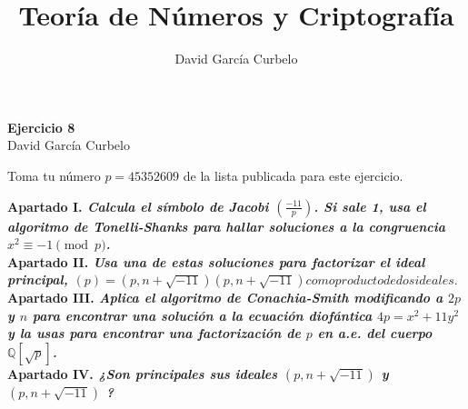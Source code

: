 \documentclass[fleqn]{article}
\author{David García Curbelo}
\title{Teoría de Números y Criptografía}
\def\Q{\mathds{Q}}
\begin{document}
    \begin{center}
        \LARGE{\textbf{Ejercicio 8}} \\
        \Large{David García Curbelo} \\
    \end{center}

    \vspace{1cm}
    Toma tu número $p = 45352609$ de la lista publicada para este ejercicio.

    \textbf{Apartado I. \textit{Calcula el símbolo de Jacobi $\left(\frac{-11}{p}\right)$. Si sale 1, usa el algoritmo de 
                                Tonelli-Shanks para hallar soluciones a la congruencia $x^2 \equiv -1 \pmod{p}$.}}\\
    

    \newpage
    \textbf{Apartado II. \textit{Usa una de estas soluciones para factorizar el ideal principal, 
                                $(p) = (p, n+ \sqrt{-11})(p, n+ \sqrt{-11}) como producto de dos ideales.$}}\\

    \newpage
    \textbf{Apartado III. \textit{Aplica el algoritmo de Conachia-Smith modificando a $2p$ y $n$ para encontrar
                                una solución a la ecuación diofántica $4p = x^2 + 11y^2 $ y la usas para encontrar 
                                una factorización de $p$ en a.e. del cuerpo $\Q[\sqrt{p}]$.}} \\


    \newpage
    \textbf{Apartado IV. \textit{¿Son principales sus ideales $(p, n+ \sqrt{-11})$ y $(p, n+ \sqrt{-11})$ ?}}\\
\end{document}
